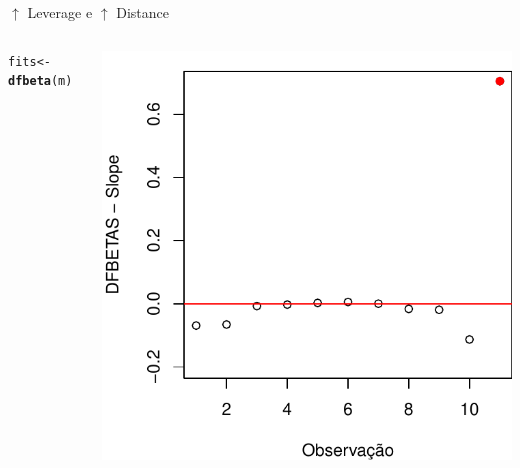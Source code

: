 \documentclass{beamer}\usepackage[]{graphicx}\usepackage[]{color}
\makeatletter
\newcommand{\hlstd}[1]{\textcolor[rgb]{0.345,0.345,0.345}{#1}}%
\newcommand{\hlkwb}[1]{\textcolor[rgb]{0.69,0.353,0.396}{#1}}%
\newcommand{\hlkwd}[1]{\textcolor[rgb]{0.737,0.353,0.396}{\textbf{#1}}}%
\newenvironment{kframe}{%
 \def\at@end@of@kframe{}%
 \ifinner\ifhmode%
  \def\at@end@of@kframe{\end{minipage}}%
  \begin{minipage}{\columnwidth}%
 \fi\fi%
 \def\FrameCommand##1{\hskip\@totalleftmargin \hskip-\fboxsep
 \colorbox{shadecolor}{##1}\hskip-\fboxsep
     \hskip-\linewidth \hskip-\@totalleftmargin \hskip\columnwidth}%
 \MakeFramed {\advance\hsize-\width
   \@totalleftmargin\z@ \linewidth\hsize
   \@setminipage}}%
 {\par\unskip\endMakeFramed%
 \at@end@of@kframe}
\newenvironment{knitrout}{}{} %
\renewenvironment{knitrout}{\setlength{\topsep}{0mm}}{}
\makeatother
\begin{document}
\begin{frame}{$\uparrow$ Leverage e $\uparrow$ Distance}
\begin{columns}[c]
\begin{knitrout}\tiny
{}\color{fgcolor}\begin{kframe}
\begin{alltt}
\hlstd{fits} \hlkwb{<-} \hlkwd{dfbeta}\hlstd{(m)}
\end{alltt}
\end{kframe}
\includegraphics[width=1\linewidth]{figure/inf8-1} 

\end{knitrout}

\end{columns}
\end{frame}
\end{document}
